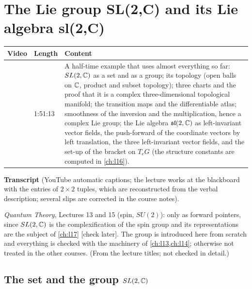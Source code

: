 \chapter{The Lie group SL(2,C) and its Lie algebra sl(2,C)}\label{ch:l15}
\begin{paracol}{2}

\begin{sources}
\begin{tabularx}{\linewidth}{@{}l l L@{}}
\toprule
\textbf{Video} & \textbf{Length} & \textbf{Content}\\
\midrule
{} & 1:51:13 & A half-time example that uses almost everything so far: $SL(2,\mathbb{C})$ as a set and as a group; its topology (open balls on $\mathbb{C}$, product and subset topology); three charts and the proof that it is a complex three-dimensional topological manifold; the transition maps and the differentiable atlas; smoothness of the inversion and the multiplication, hence a complex Lie group; the Lie algebra $\mathfrak{sl}(2,\mathbb{C})$ as left-invariant vector fields, the push-forward of the coordinate vectors by left translation, the three left-invariant vector fields, and the set-up of the bracket on $T_eG$ (the structure constants are computed in \cref{ch:l16}).\\
\bottomrule
\end{tabularx}

\smallskip
\textbf{Transcript}  (YouTube automatic captions; the lecture works at the blackboard with the entries of $2\times2$ tuples, which are reconstructed from the verbal description; several slips are corrected in the course notes).
\end{sources}

\begin{reading}
\emph{Quantum Theory}, Lectures 13 and 15 (spin, $SU(2)$): only as forward pointers, since $SL(2,\mathbb{C})$ is the complexification of the spin group and its representations are the subject of \cref{ch:l17} [check later]. The group is introduced here from scratch and everything is checked with the machinery of \cref{ch:l13,ch:l14}; otherwise not treated in the other courses. (From the lecture titles; not checked in detail.)
\end{reading}

\section{The set and the group $SL(2,\mathbb{C})$}\label{sec:sl-group}


\end{paracol}
